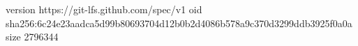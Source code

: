 version https://git-lfs.github.com/spec/v1
oid sha256:6c24e23aadca5d99b80693704d12b0b2d4086b578a9c370d3299ddb3925f0a0a
size 2796344
